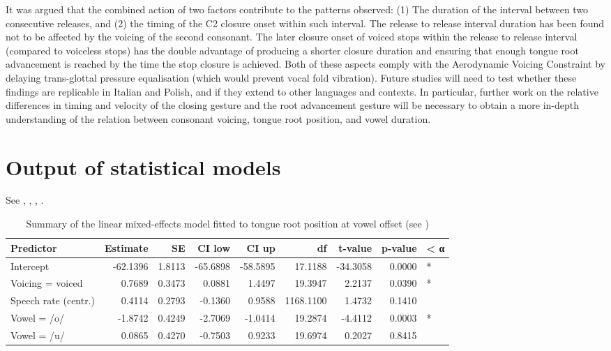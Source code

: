 \documentclass[preprint]{JASAnew}
\begin{document}
It was argued that the combined action of two factors contribute to the
patterns observed: (1) The duration of the interval between two
consecutive releases, and (2) the timing of the C2 closure onset within
such interval. The release to release interval duration has been found
not to be affected by the voicing of the second consonant. The later
closure onset of voiced stops within the release to release interval
(compared to voiceless stops) has the double advantage of producing a
shorter closure duration and ensuring that enough tongue root
advancement is reached by the time the stop closure is achieved. Both of
these aspects comply with the Aerodynamic Voicing Constraint
\citep{ohala2011} by delaying trans-glottal pressure equalisation (which
would prevent vocal fold vibration). Future studies will need to test
whether these findings are replicable in Italian and Polish, and if they
extend to other languages and contexts. In particular, further work on
the relative differences in timing and velocity of the closing gesture
and the root advancement gesture will be necessary to obtain a more
in-depth understanding of the relation between consonant voicing, tongue
root position, and vowel duration.

\appendix

\hypertarget{output-of-statistical-models}{%
\section{Output of statistical
models}\label{output-of-statistical-models}}

See , ,
, .

\begin{table}

\caption{\label{tab:tra-lm-table}Summary of the linear mixed-effects model fitted to tongue root position at vowel offset (see )}
\centering
\fontsize{10}{12}\selectfont
\begin{tabular}[t]{lrrrrrrrl}
\toprule
Predictor & Estimate & SE & CI low & CI up & df & t-value & p-value & < α\\
\midrule
Intercept & -62.1396 & 1.8113 & -65.6898 & -58.5895 & 17.1188 & -34.3058 & 0.0000 & *\\
Voicing = voiced & 0.7689 & 0.3473 & 0.0881 & 1.4497 & 19.3947 & 2.2137 & 0.0390 & *\\
Speech rate (centr.) & 0.4114 & 0.2793 & -0.1360 & 0.9588 & 1168.1100 & 1.4732 & 0.1410 & \\
Vowel = /o/ & -1.8742 & 0.4249 & -2.7069 & -1.0414 & 19.2874 & -4.4112 & 0.0003 & *\\
Vowel = /u/ & 0.0865 & 0.4270 & -0.7503 & 0.9233 & 19.6974 & 0.2027 & 0.8415 & \\
\bottomrule
\end{tabular}
\end{table}
\end{document}

